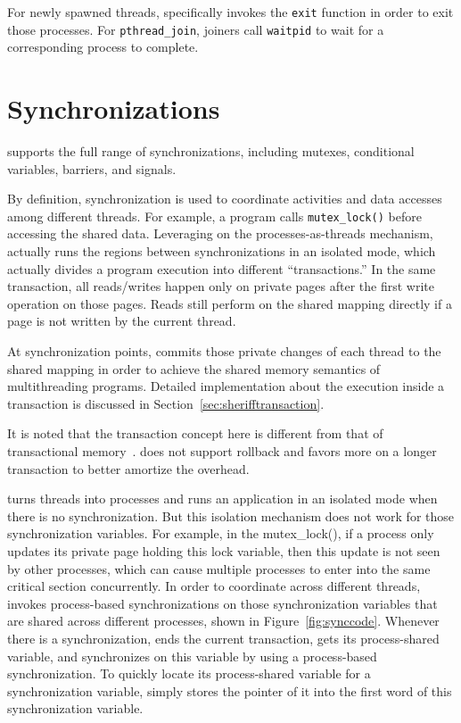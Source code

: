 For newly spawned threads, \sheriff{} specifically invokes the \texttt{exit} function in order to exit those processes. For \texttt{pthread\_join}, joiners call \texttt{waitpid} to wait for a corresponding process to complete.  

\section{Synchronizations}
\label{sec:sheriffsync}

\sheriff{} supports the full range of synchronizations, including mutexes, conditional variables, barriers, and signals. 

By definition, synchronization is used to coordinate activities and data accesses among different threads. For example, a program calls \texttt{mutex\_lock()} before accessing the shared data. Leveraging on the processes-as-threads mechanism, \sheriff{} actually runs the regions between synchronizations in an isolated mode, which actually divides a program execution into different ``transactions.'' In the same transaction, all reads/writes happen only on private pages after the first write operation on those pages. Reads still perform on the shared mapping directly if a page is not written by the current thread.

At synchronization points, \sheriff{} commits those private changes of each thread to the shared mapping in order to achieve the shared memory semantics of multithreading programs. Detailed implementation about the execution inside a transaction is discussed in Section~\ref{sec:sherifftransaction}. 

It is noted that the transaction concept here is different from that of transactional memory~\cite{transaction}. \sheriff{} does not support rollback and favors more on a longer transaction to better amortize the overhead. 

\sheriff{} turns threads into processes and runs an application in an isolated mode when there is no synchronization. But this isolation mechanism does not work for those synchronization variables. For example, in the mutex\_lock(), if a process only updates its private page holding this lock variable, then this update is not seen by other processes, which can cause multiple processes to enter into the same critical section concurrently. In order to coordinate across different threads, \sheriff{} invokes process-based synchronizations on those synchronization variables that are shared across different processes, shown in Figure~\ref{fig:synccode}. Whenever there is a synchronization, \sheriff{} ends the current transaction, gets its process-shared variable, and synchronizes on this variable by using a process-based synchronization. To quickly locate its process-shared variable for a synchronization variable, \sheriff{} simply stores the pointer of it into the first word of this synchronization variable. 
 
